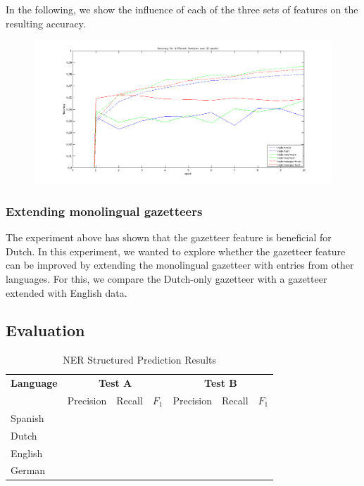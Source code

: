 \documentclass[11pt]{article}
\begin{document}
In the following, we show the influence of each of the three sets of features on the resulting accuracy.
\FloatBarrier
\begin{figure}[t!]
\centering
 \includegraphics[scale=0.5]{Plot.png}
\end{figure}


\subsubsection{Extending monolingual gazetteers}

The experiment above has shown that the gazetteer feature is beneficial for Dutch. In this experiment, we wanted to explore whether the 
gazetteer feature can be improved by extending the monolingual gazetteer with entries from other languages. For this, we compare the 
Dutch-only gazetteer with a gazetteer extended with English data.



\subsection{Evaluation}

\begin{table}[t]
\centering
\begin{tabular}{| l | l l l| l l l |}

\hline
\bf Language & \multicolumn{3}{c|}{ \bf Test A}&\multicolumn{3}{c|}{ \bf Test B}\\
             & Precision & Recall & $F_1$ & Precision & Recall & $F_1$ \\ \hline
Spanish &       &          &     &          &               & \\
Dutch  &         &          &     &          &               &   \\
English &        &          &     &          &               &       \\
German &      &          &       &          &             & \\
\hline
\end{tabular}
\caption{NER Structured Prediction Results }
\label{table:Results}
\end{table}
\end{document}

